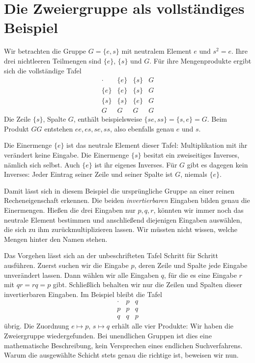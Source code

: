 \par{}
\section*{Die Zweiergruppe als vollständiges Beispiel}
\hypertarget{reconstruction.reading.example}{}

Wir betrachten die Gruppe \(G=\{e,s\}\) mit neutralem Element
\(e\) und \(s^2=e\). Ihre drei nichtleeren Teilmengen sind
\(\{e\}\), \(\{s\}\) und \(G\). Für ihre Mengenprodukte ergibt
sich die vollständige Tafel
\[
  \renewcommand{\arraystretch}{1.35}
  \begin{array}{c|ccc}
    \cdot&\{e\}&\{s\}&G\\\hline
    \{e\}&\{e\}&\{s\}&G\\
    \{s\}&\{s\}&\{e\}&G\\
    G&G&G&G
  \end{array}
\]
Die Zeile \(\{s\}\), Spalte \(G\), enthält beispielsweise
\(\{se,ss\}=\{s,e\}=G\). Beim Produkt \(GG\) entstehen
\(ee,es,se,ss\), also ebenfalls genau \(e\) und \(s\).

Die Einermenge \(\{e\}\) ist das neutrale Element dieser Tafel:
Multiplikation mit ihr verändert keine Eingabe. Die Einermenge
\(\{s\}\) besitzt ein zweiseitiges Inverses, nämlich sich selbst.
Auch \(\{e\}\) ist ihr eigenes Inverses. Für \(G\) gibt es dagegen
kein Inverses: Jeder Eintrag seiner Zeile und seiner Spalte ist
\(G\), niemals \(\{e\}\).

Damit lässt sich in diesem Beispiel die ursprüngliche Gruppe
an einer reinen Recheneigenschaft erkennen. Die beiden
\emph{invertierbaren} Eingaben bilden genau die Einermengen.
Hießen die drei Eingaben nur \(p,q,r\), könnten wir immer noch
das neutrale Element bestimmen und anschließend diejenigen
Eingaben auswählen, die sich zu ihm zurückmultiplizieren lassen.
Wir müssten nicht wissen, welche Mengen hinter den Namen stehen.

Das Vorgehen lässt sich an der unbeschrifteten Tafel Schritt für
Schritt ausführen. Zuerst suchen wir die Eingabe \(p\), deren Zeile
und Spalte jede Eingabe unverändert lassen. Dann wählen wir alle
Eingaben \(q\), für die es eine Eingabe \(r\) mit \(qr=rq=p\) gibt.
Schließlich behalten wir nur die Zeilen und Spalten dieser
invertierbaren Eingaben. Im Beispiel bleibt die Tafel
\[
  \begin{array}{c|cc}
    \cdot&p&q\\\hline
    p&p&q\\
    q&q&p
  \end{array}
\]
übrig. Die Zuordnung \(e\mapsto p\), \(s\mapsto q\) erhält
alle vier Produkte: Wir haben die Zweiergruppe wiedergefunden.
Bei unendlichen Gruppen ist dies eine mathematische Beschreibung,
kein Versprechen eines endlichen Suchverfahrens. Warum die
ausgewählte Schicht stets genau die richtige ist, beweisen wir nun.

